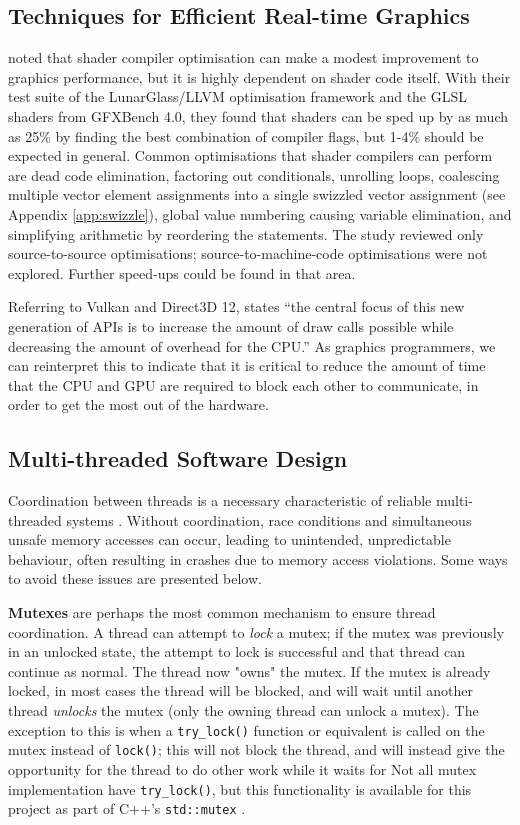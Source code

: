 \documentclass[11pt, a4paper, twocolumn]{article}
\begin{document}
\subsection{Techniques for Efficient Real-time Graphics}

\citet{Crawford2018} noted that shader compiler optimisation can make a modest improvement to graphics performance, but it is highly dependent on shader code itself. With their test suite of the LunarGlass/LLVM optimisation framework and the GLSL shaders from GFXBench 4.0, they found that shaders can be sped up by as much as 25\% by finding the best combination of compiler flags, but 1-4\% should be expected in general. Common optimisations that shader compilers can perform are dead code elimination, factoring out conditionals, unrolling loops, coalescing multiple vector element assignments into a single swizzled vector assignment (see Appendix \ref{app:swizzle}), global value numbering causing variable elimination, and simplifying arithmetic by reordering the statements. The study reviewed only source-to-source optimisations; source-to-machine-code optimisations were not explored. Further speed-ups could be found in that area.

Referring to Vulkan and Direct3D 12, \citet{Joseph2016} states ``the central focus of this new generation of APIs is to increase the amount of draw calls possible while decreasing the amount of overhead for the CPU.'' As graphics programmers, we can reinterpret this to indicate that it is critical to reduce the amount of time that the CPU and GPU are required to block each other to communicate, in order to get the most out of the hardware.

\subsection{Multi-threaded Software Design}

Coordination between threads is a necessary characteristic of reliable multi-threaded systems \citep{Powell}. Without coordination, race conditions and simultaneous unsafe memory accesses can occur, leading to unintended, unpredictable behaviour, often resulting in crashes due to memory access violations. Some ways to avoid these issues are presented below.

\textbf{Mutexes} are perhaps the most common mechanism to ensure thread coordination. A thread can attempt to \emph{lock} a mutex; if the mutex was previously in an unlocked state, the attempt to lock is successful and that thread can continue as normal. The thread now "owns" the mutex. If the mutex is already locked, in most cases the thread will be blocked, and will wait until another thread \emph{unlocks} the mutex (only the owning thread can unlock a mutex). The exception to this is when a \verb|try_lock()| function or equivalent is called on the mutex instead of \verb|lock()|; this will not block the thread, and will instead give the opportunity for the thread to do other work while it waits for  Not all mutex implementation have \verb|try_lock()|, but this functionality is available for this project as part of C++'s \verb|std::mutex| \citep{CppMutex}.
\end{document}
